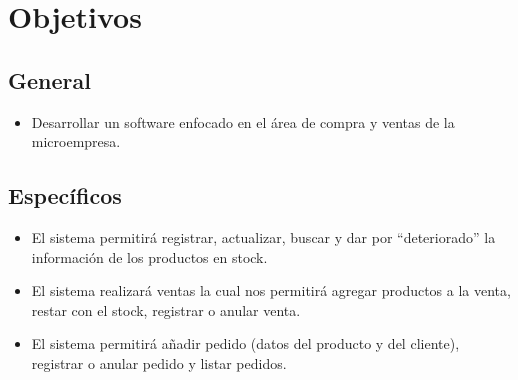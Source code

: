 \documentclass[preprint,12pt]{elsarticle}
\begin{document}
\section{Objetivos}
		\subsection{\textbf{ General }}
	 \begin{itemize}
		\item Desarrollar un software enfocado en el área de compra y ventas de la microempresa.
	 \end{itemize}
		\subsection{\textbf{Específicos }}
\begin{itemize}
	\item El sistema permitirá registrar, actualizar, buscar y dar por “deteriorado” la información de los productos en stock.
	\item El sistema realizará ventas la cual nos permitirá agregar productos a la venta, restar con el stock, registrar o anular venta. 
	\item El sistema permitirá añadir pedido (datos del producto y del cliente), registrar o anular pedido y listar pedidos. 
	\end{itemize}
\end{document}
